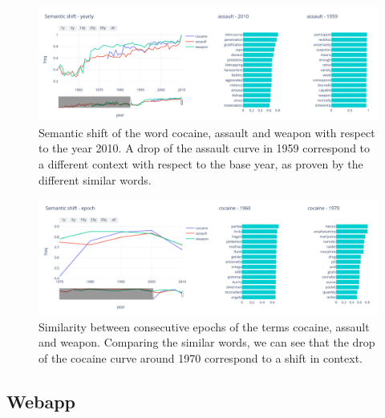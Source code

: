 \begin{figure}
\begin{center}
  \includegraphics[width=\textwidth]{images/semantic_2.png}
  \caption{Semantic shift of the word cocaine, assault and weapon 
  with respect to the year 2010. A drop of the assault curve in 1959 correspond to 
  a different context with respect to the base year, as proven by the different similar words.} \label{fig2}
\end{center}
\end{figure}

\begin{figure}
  \begin{center}
    \includegraphics[width=\textwidth]{images/semantic_1.png}
    \caption{Similarity between consecutive epochs of the terms cocaine, assault and weapon. Comparing 
    the similar words, we can see that the drop of the cocaine curve around 1970 correspond to a shift in context.} \label{fig3}
  \end{center}
\end{figure}

\subsection{Webapp}

